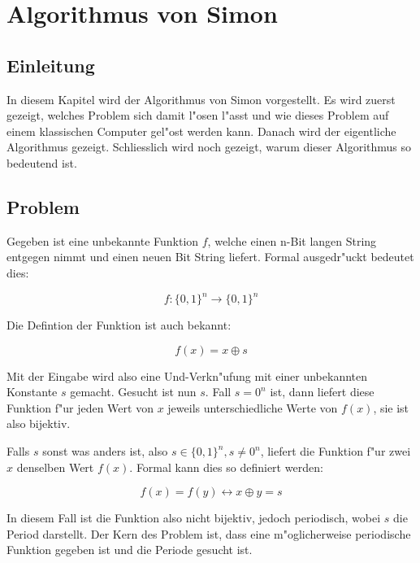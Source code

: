 \chapter{Algorithmus von Simon\label{chapter:simon}} 
\begin{refsection} 

\section{Einleitung} 

In diesem Kapitel wird der Algorithmus von Simon vorgestellt.  Es wird zuerst
gezeigt, welches Problem sich damit l"osen l"asst und wie dieses Problem auf
einem klassischen Computer gel"ost werden kann. Danach wird der eigentliche
Algorithmus gezeigt. Schliesslich wird noch gezeigt, warum dieser Algorithmus so
bedeutend ist.

\section{Problem} 

Gegeben ist eine unbekannte Funktion $f$, welche einen n-Bit langen String
entgegen nimmt und einen neuen Bit String liefert. Formal ausgedr"uckt bedeutet
dies:

\[
    f\colon\{0,1\}^n\to\{0,1\}^n
\]

Die Defintion der Funktion ist auch bekannt:

\[
    f(x) = x \oplus s
\]

Mit der Eingabe wird also eine Und-Verkn"ufung mit einer unbekannten Konstante
$s$ gemacht.  Gesucht ist nun $s$. Fall $s = 0^n$ ist, dann liefert diese
Funktion f"ur jeden Wert von $x$ jeweils unterschiedliche Werte von $f(x)$, sie
ist also bijektiv.

Falls $s$ sonst was anders ist, also $s \in \{0,1\}^n, s \neq 0^n$, liefert die
Funktion f"ur zwei $x$ denselben Wert $f(x)$. Formal kann dies so definiert
werden:

\[ 
    f(x) = f(y) \leftrightarrow x \oplus y = s 
\]

In diesem Fall ist die Funktion also nicht bijektiv, jedoch periodisch, wobei
$s$ die Period darstellt. Der Kern des Problem ist, dass eine m"oglicherweise
periodische Funktion gegeben ist und die Periode gesucht ist.


\end{refsection}
